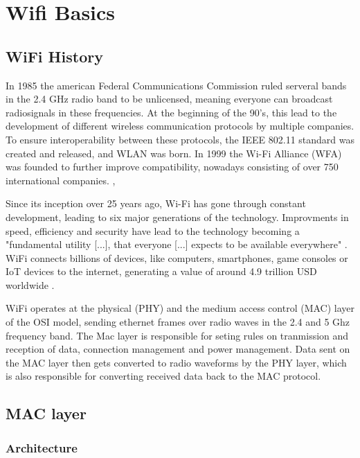 \chapter{Wifi Basics}\label{ch:wifi_basics}

\section{WiFi History}

In 1985 the american Federal Communications Commission ruled serveral bands in the 2.4 GHz radio band to be unlicensed, meaning everyone can broadcast radiosignals in these frequencies.
At the beginning of the 90's, this lead to the development of different wireless communication protocols by multiple companies.
To ensure interoperability between these protocols, the IEEE 802.11 standard was created and released, and WLAN was born.
In 1999 the Wi-Fi Alliance (WFA) was founded to further improve compatibility, nowadays consisting of over 750 international companies. \cite[page~1-3]{Sankaran_Gulasekaran_2021}, \cite{Wikipedia_2025}

Since its inception over 25 years ago, Wi-Fi has gone through constant development, leading to six major generations of the technology.
Improvments in speed, efficiency and security have lead to the technology becoming a "fundamental utility [...], that everyone [...] expects to be available everywhere" \cite[page~1]{Sankaran_Gulasekaran_2021}.
WiFi connects billions of devices, like computers, smartphones, game consoles or IoT devices to the internet, generating a value of around 4.9 trillion USD worldwide \cite[page~1]{Sankaran_Gulasekaran_2021}.

WiFi operates at the physical (PHY) and the medium access control (MAC) layer of the OSI model, sending ethernet frames over radio waves in the 2.4 and 5 Ghz frequency band. 
The Mac layer is responsible for seting rules on tranmission and reception of data, connection management and power management.
Data sent on the MAC layer then gets converted to radio waveforms by the PHY layer, which is also responsible for converting received data back to the MAC protocol. \cite[page~4-7]{Sankaran_Gulasekaran_2021}

\section{MAC layer}

\subsection{Architecture}


